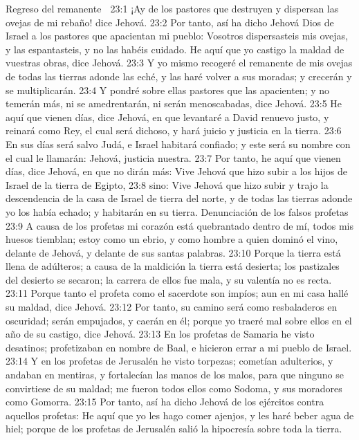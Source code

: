 Regreso del remanente  

23:1 ¡Ay de los pastores que destruyen y dispersan las ovejas de mi rebaño! dice Jehová.  
23:2 Por tanto, así ha dicho Jehová Dios de Israel a los pastores que apacientan mi pueblo: Vosotros dispersasteis mis ovejas, y las espantasteis, y no las habéis cuidado. He aquí que yo castigo la maldad de vuestras obras, dice Jehová.  
23:3 Y yo mismo recogeré el remanente de mis ovejas de todas las tierras adonde las eché, y las haré volver a sus moradas; y crecerán y se multiplicarán.  
23:4 Y pondré sobre ellas pastores que las apacienten; y no temerán más, ni se amedrentarán, ni serán menoscabadas, dice Jehová.  
23:5 He aquí que vienen días, dice Jehová, en que levantaré a David renuevo justo, y reinará como Rey, el cual será dichoso, y hará juicio y justicia en la tierra. 
23:6 En sus días será salvo Judá, e Israel habitará confiado; y este será su nombre con el cual le llamarán: Jehová, justicia nuestra. 
23:7 Por tanto, he aquí que vienen días, dice Jehová, en que no dirán más: Vive Jehová que hizo subir a los hijos de Israel de la tierra de Egipto,  
23:8 sino: Vive Jehová que hizo subir y trajo la descendencia de la casa de Israel de tierra del norte, y de todas las tierras adonde yo los había echado; y habitarán en su tierra.  
Denunciación de los falsos profetas  
23:9 A causa de los profetas mi corazón está quebrantado dentro de mí, todos mis huesos tiemblan; estoy como un ebrio, y como hombre a quien dominó el vino, delante de Jehová, y delante de sus santas palabras.  
23:10 Porque la tierra está llena de adúlteros; a causa de la maldición la tierra está desierta; los pastizales del desierto se secaron; la carrera de ellos fue mala, y su valentía no es recta.  
23:11 Porque tanto el profeta como el sacerdote son impíos; aun en mi casa hallé su maldad, dice Jehová.  
23:12 Por tanto, su camino será como resbaladeros en oscuridad; serán empujados, y caerán en él; porque yo traeré mal sobre ellos en el año de su castigo, dice Jehová.  
23:13 En los profetas de Samaria he visto desatinos; profetizaban en nombre de Baal, e hicieron errar a mi pueblo de Israel.  
23:14 Y en los profetas de Jerusalén he visto torpezas; cometían adulterios, y andaban en mentiras, y fortalecían las manos de los malos, para que ninguno se convirtiese de su maldad; me fueron todos ellos como Sodoma, y sus moradores como Gomorra.  
23:15 Por tanto, así ha dicho Jehová de los ejércitos contra aquellos profetas: He aquí que yo les hago comer ajenjos, y les haré beber agua de hiel; porque de los profetas de Jerusalén salió la hipocresía sobre toda la tierra.  
